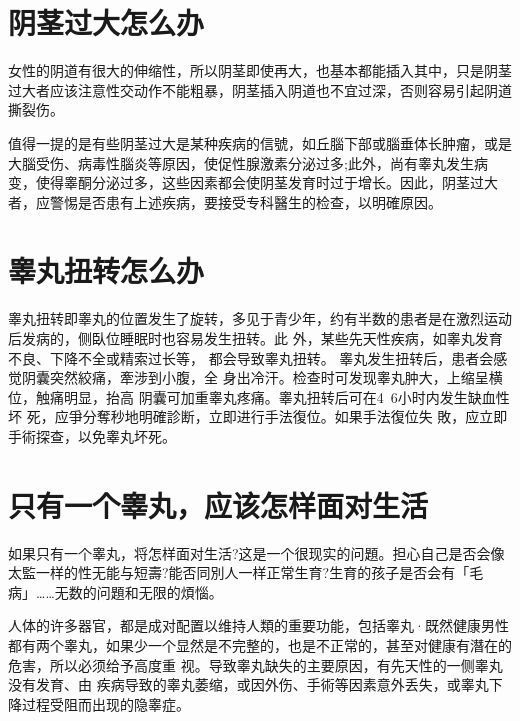 \documentclass[12pt,UTF8]{ctexbook}
\begin{document}
\section{阴茎过大怎么办}

女性的阴道有很大的伸缩性，所以阴茎即使再大，也基本都能插入其中，只是阴茎过大者应该注意性交动作不能粗暴，阴茎插入阴道也不宜过深，否则容易引起阴道撕裂伤。

值得一提的是有些阴茎过大是某种疾病的信號，如丘腦下部或腦垂体长肿瘤，或是大腦受伤、病毒性腦炎等原因，使促性腺激素分泌过多;此外，尚有睾丸发生病变，使得睾酮分泌过多，这些因素都会使阴茎发育时过于增长。因此，阴茎过大者，应警惕是否患有上述疾病，要接受专科醫生的检查，以明確原因。

\section{睾丸扭转怎么办}

睾丸扭转即睾丸的位置发生了旋转，多见于青少年，约有半数的患者是在激烈运动后发病的，侧臥位睡眠时也容易发生扭转。此
外，某些先天性疾病，如睾丸发育不良、下降不全或精索过长等，
都会导致睾丸扭转。
睾丸发生扭转后，患者会感觉阴囊突然絞痛，牽涉到小腹，全
身出冷汗。检查时可发现睾丸肿大，上缩呈横位，触痛明显，抬高
阴囊可加重睾丸疼痛。睾丸扭转后可在4~6小时内发生缺血性坏
死，应爭分奪秒地明確診断，立即进行手法復位。如果手法復位失
敗，应立即手術探查，以免睾丸坏死。

\section{只有一个睾丸，应该怎样面对生活}

如果只有一个睾丸，将怎样面对生活?这是一个很现实的问題。担心自己是否会像太監一样的性无能与短壽?能否同別人一样正常生育?生育的孩子是否会有「毛病」……无数的问題和无限的煩惱。

人体的许多器官，都是成对配置以维持人類的重要功能，包括睾丸·既然健康男性都有两个睾丸，如果少一个显然是不完整的，也是不正常的，甚至对健康有潛在的危害，所以必须给予高度重
视。导致睾丸缺失的主要原因，有先天性的一侧睾丸没有发育、由
疾病导致的睾丸萎缩，或因外伤、手術等因素意外丢失，或睾丸下
降过程受阻而出现的隐睾症。
\end{document}
